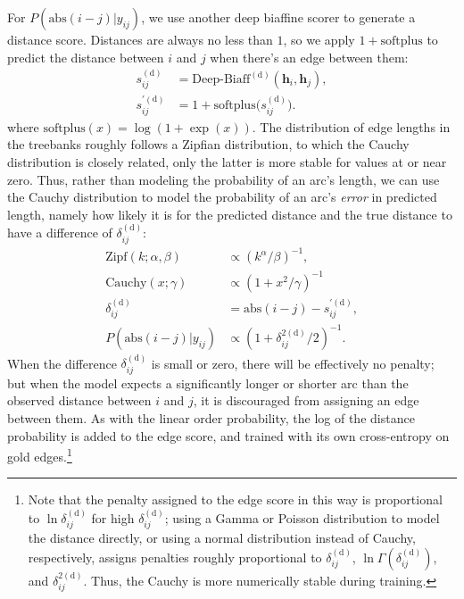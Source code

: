 \documentclass[11pt,a4paper]{article}
\begin{document}
For $P(\text{abs}(i-j) | y_{ij})$, we use another deep biaffine scorer to generate a distance score. Distances are always no less than $1$, so we apply $1+\text{softplus}$ to predict the distance between $i$ and $j$ when there's an edge between them:
\begin{align}
  s_{ij}^{(\text{d})} &= \text{Deep-Biaff}^{(\text{d})}(\mathbf{h}_i, \mathbf{h}_j) ,\\
  s_{ij}^{\prime(\text{d})} &= 1+\text{softplus}\big(s_{ij}^{(\text{d})}\big) .
\end{align}
where $\text{softplus}(x) = \log(1+\exp(x))$.
The distribution of edge lengths in the treebanks roughly follows a Zipfian distribution, to which the Cauchy distribution is closely related, only the latter is more stable for values at or near zero. Thus, rather than modeling the probability of an arc's length, we can use the Cauchy distribution to model the probability of an arc's \emph{error} in predicted length, namely how likely it is for the predicted distance and the true distance to have a difference of $\delta_{ij}^{(\text{d})}$:
\begin{align}
  \text{Zipf}(k; \alpha, \beta) &\propto (k^{\alpha}/{\beta})^{-1} ,\\
  \text{Cauchy}(x; \gamma) &\propto (1+x^2/{\gamma})^{-1}\\
  \delta_{ij}^{(\text{d})} &= \text{abs}(i-j) - s_{ij}^{\prime(\text{d})} ,\\
  P(\text{abs}(i-j) | y_{ij}) &\propto (1+\delta_{ij}^{2(\text{d})} / 2)^{-1} \label{eqn:distance} .
\end{align}
When the difference $\delta_{ij}^{(\text{d})}$ is small or zero, there will be effectively no penalty; but when the model expects a significantly longer or shorter arc than the observed distance between $i$ and $j$, it is discouraged from assigning an edge between them. As with the linear order probability, the log of the distance probability is added to the edge score, and trained with its own cross-entropy on gold edges.\footnote{Note that the penalty assigned to the edge score in this way is proportional to $\ln \delta_{ij}^{(\text{d})}$ for high $\delta_{ij}^{(\text{d})}$;
using a Gamma or Poisson distribution to model the distance directly, or using a normal distribution instead of Cauchy, respectively, assigns penalties roughly proportional to $\delta_{ij}^{(\text{d})}$, $\ln\Gamma(\delta_{ij}^{(\text{d})})$, and $\delta_{ij}^{2(\text{d})}$.
Thus, the Cauchy is more numerically stable during training.}
\end{document}
